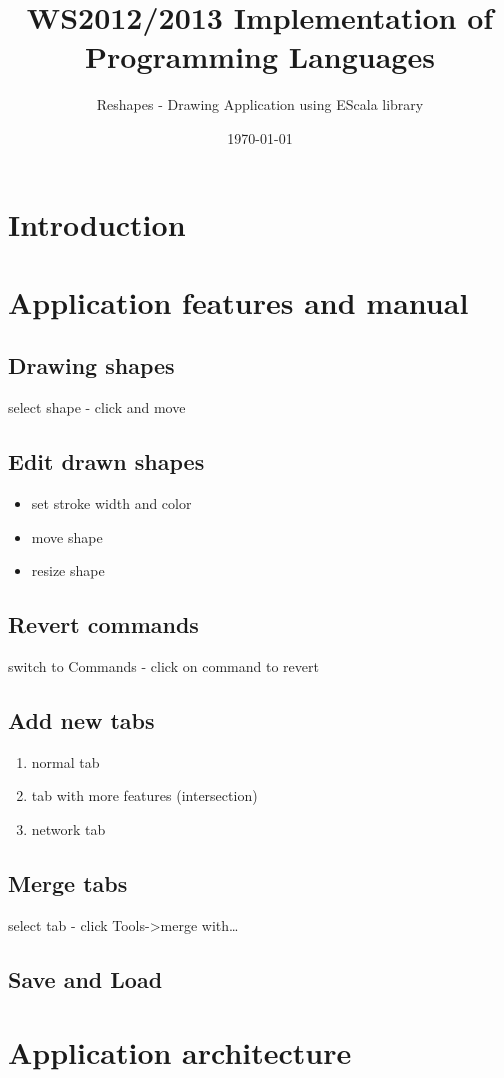 \documentclass[12pt, accentcolor=tud9c, linedtoc, bigchapter, colorback, noresetcounter, numbersubsubsec]{tudreport}
\date{\today}
\title{WS2012/2013 Implementation of Programming Languages}
\subtitle{Reshapes - Drawing Application using EScala library}
\begin{document}
\maketitle
\tableofcontents

\chapter{Introduction}

\chapter{Application features and manual}

\section{Drawing shapes}

select shape - click and move

\section{Edit drawn shapes}

\begin{itemize}
    \item set stroke width and color
    \item move shape
    \item resize shape
\end{itemize}

\section{Revert commands}

switch to Commands - click on command to revert

\section{Add new tabs}

\begin{enumerate}
    \item normal tab
    \item tab with more features (intersection)
    \item network tab
\end{enumerate}

\section{Merge tabs}

select tab - click Tools->merge with\dots

\section{Save and Load}

\chapter{Application architecture}
\end{document}
